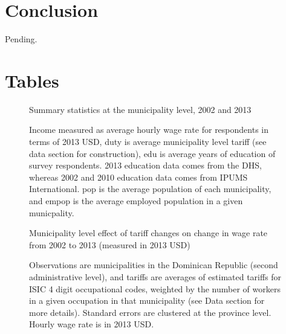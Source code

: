 \documentclass[12pt]{article}
\begin{document}
\vspace{-10pt}
\section{Conclusion}
\label{sec:Conclusion}
Pending.

\newpage
\singlespacing



\newpage
\appendix
\singlespacing

\section{Tables}
\label{sec:Tables}
\fontsize{10pt}{12pt}\selectfont

\begin{figure}[H]
\begin{center}
Summary statistics at the municipality level, 2002 and 2013

\caption{\label{fig:Summary 1}}
\end{center}
Income measured
as average hourly wage rate for respondents in terms of 2013 USD, 
duty is average municipality level tariff (see data
section for construction), edu is average years of education of survey respondents. 
2013 education data comes from the DHS, whereas 2002 and 2010 education data comes
from IPUMS International. pop is the average population of each municipality,
and empop is the average employed population in a given municpality.
\end{figure}

\begin{landscape}
\begin{figure}[H]
\begin{center}
Municipality level effect of tariff changes on change in wage rate from 2002 to 2013 (measured
in 2013 USD)

\caption{\label{fig:Table1}}
\end{center}
Observations are municipalities in the Dominican Republic (second administrative level),
and tariffs are averages of estimated tariffs for ISIC 4 %
digit occupational codes,
weighted by the number of workers in a given occupation in that municipality 
(see Data section for more details). Standard errors are clustered at the province level.
Hourly wage rate is in 2013 USD.
\end{figure}
\end{landscape}
\end{document}
